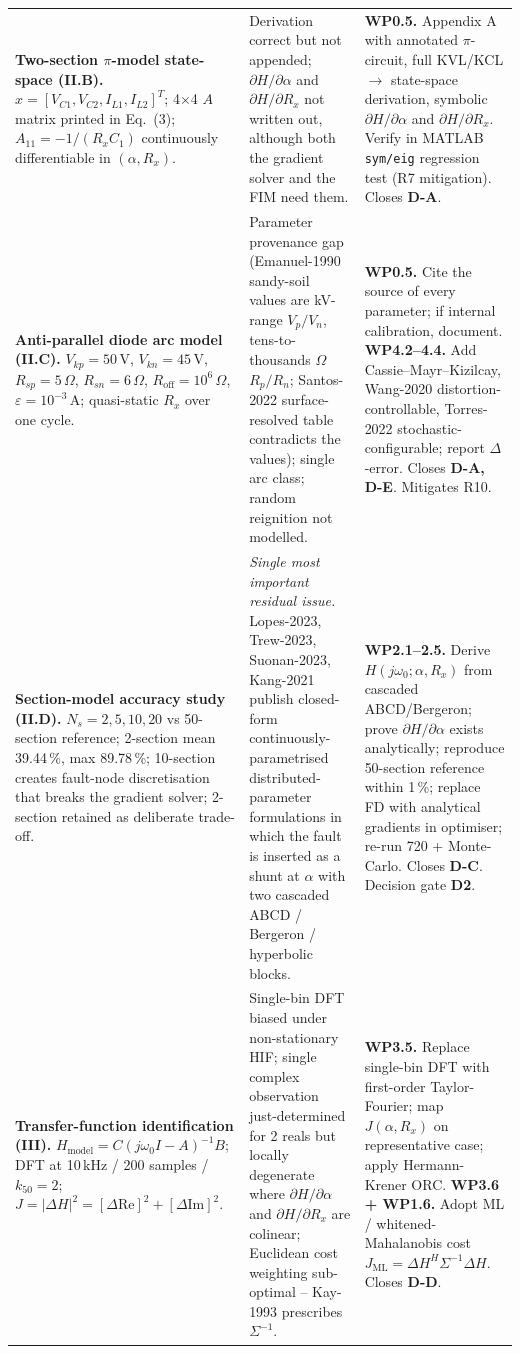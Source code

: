 \documentclass[11pt,a4paper]{article}
\begin{document}
\begin{longtable}{L{4.4cm}L{4.6cm}L{6.0cm}}
\textbf{Two-section $\pi$-model state-space (II.B).}
$x = [V_{C1}, V_{C2}, I_{L1}, I_{L2}]^T$; 4$\times$4 $A$ matrix printed in
Eq.~(3); $A_{11} = -1/(R_x C_1)$ continuously differentiable in
$(\alpha, R_x)$.
&
Derivation correct but not appended; $\partial H/\partial\alpha$ and
$\partial H/\partial R_x$ not written out, although both the gradient
solver and the FIM need them.
&
\textbf{WP0.5.} Appendix A with annotated $\pi$-circuit, full KVL/KCL
$\rightarrow$ state-space derivation, symbolic
$\partial H/\partial\alpha$ and $\partial H/\partial R_x$.  Verify in
MATLAB \texttt{sym/eig} regression test (R7 mitigation).
Closes \textbf{D-A}.\\

\textbf{Anti-parallel diode arc model (II.C).}
$V_{kp}=50$\,V, $V_{kn}=45$\,V, $R_{sp}=5\,\Omega$, $R_{sn}=6\,\Omega$,
$R_{\mathrm{off}}=10^{6}\,\Omega$, $\varepsilon=10^{-3}$\,A;
quasi-static $R_x$ over one cycle.
&
Parameter provenance gap (Emanuel-1990 sandy-soil values are kV-range
$V_p / V_n$, tens-to-thousands $\Omega$ $R_p / R_n$;
Santos-2022 surface-resolved table contradicts the values); single arc
class; random reignition not modelled.
&
\textbf{WP0.5.} Cite the source of every parameter; if internal
calibration, document. \textbf{WP4.2--4.4.} Add Cassie--Mayr--Kizilcay,
Wang-2020 distortion-controllable, Torres-2022 stochastic-configurable;
report $\Delta$-error.  Closes \textbf{D-A, D-E}.  Mitigates R10.\\

\textbf{Section-model accuracy study (II.D).}
$N_s=2,5,10,20$ vs 50-section reference; 2-section mean 39.44\,\%, max
89.78\,\%; 10-section creates fault-node discretisation that breaks the
gradient solver; 2-section retained as deliberate trade-off.
&
\emph{Single most important residual issue.} Lopes-2023, Trew-2023,
Suonan-2023, Kang-2021 publish closed-form continuously-parametrised
distributed-parameter formulations in which the fault is inserted as a
shunt at $\alpha$ with two cascaded ABCD / Bergeron / hyperbolic blocks.
&
\textbf{WP2.1--2.5.} Derive $H(j\omega_0; \alpha, R_x)$ from cascaded
ABCD/Bergeron; prove $\partial H/\partial\alpha$ exists analytically;
reproduce 50-section reference within 1\,\%; replace FD with analytical
gradients in optimiser; re-run 720 + Monte-Carlo.  Closes \textbf{D-C}.
Decision gate \textbf{D2}.\\

\textbf{Transfer-function identification (III).}
$H_{\mathrm{model}} = C(j\omega_0 I - A)^{-1}B$; DFT at 10\,kHz / 200
samples / $k_{50}=2$; $J=|\Delta H|^2 = [\Delta\mathrm{Re}]^2 +
[\Delta\mathrm{Im}]^2$.
&
Single-bin DFT biased under non-stationary HIF; single complex observation
just-determined for 2 reals but locally degenerate where
$\partial H/\partial\alpha$ and $\partial H/\partial R_x$ are colinear;
Euclidean cost weighting sub-optimal -- Kay-1993 prescribes $\Sigma^{-1}$.
&
\textbf{WP3.5.} Replace single-bin DFT with first-order Taylor-Fourier;
map $J(\alpha, R_x)$ on representative case; apply Hermann-Krener ORC.
\textbf{WP3.6 + WP1.6.} Adopt ML / whitened-Mahalanobis cost
$J_{\mathrm{ML}} = \Delta H^H \Sigma^{-1}\Delta H$.  Closes \textbf{D-D}.\\


\end{longtable}
\end{document}
